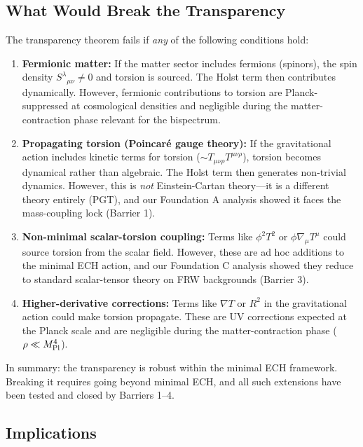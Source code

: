 \documentclass[a4paper,11pt]{article}
\newcommand{\Mpl}{M_{\rm Pl}}
\begin{document}
\subsection{What Would Break the Transparency}

The transparency theorem fails if \emph{any} of the following conditions hold:

\begin{enumerate}
\item \textbf{Fermionic matter:} If the matter sector includes fermions (spinors), the spin density $S^\lambda{}_{\mu\nu} \neq 0$ and torsion is sourced. The Holst term then contributes dynamically. However, fermionic contributions to torsion are Planck-suppressed at cosmological densities and negligible during the matter-contraction phase relevant for the bispectrum.

\item \textbf{Propagating torsion (Poincar\'e gauge theory):} If the gravitational action includes kinetic terms for torsion ($\sim T_{\mu\nu\rho}T^{\mu\nu\rho}$), torsion becomes dynamical rather than algebraic. The Holst term then generates non-trivial dynamics. However, this is \emph{not} Einstein-Cartan theory---it is a different theory entirely (PGT), and our Foundation A analysis showed it faces the mass-coupling lock (Barrier 1).

\item \textbf{Non-minimal scalar-torsion coupling:} Terms like $\phi^2 T^2$ or $\phi \nabla_\mu T^\mu$ could source torsion from the scalar field. However, these are ad hoc additions to the minimal ECH action, and our Foundation C analysis showed they reduce to standard scalar-tensor theory on FRW backgrounds (Barrier 3).

\item \textbf{Higher-derivative corrections:} Terms like $\nabla T$ or $R^2$ in the gravitational action could make torsion propagate. These are UV corrections expected at the Planck scale and are negligible during the matter-contraction phase ($\rho \ll \Mpl^4$).
\end{enumerate}

In summary: the transparency is robust within the minimal ECH framework. Breaking it requires going beyond minimal ECH, and all such extensions have been tested and closed by Barriers 1--4.

\subsection{Implications}
\end{document}
